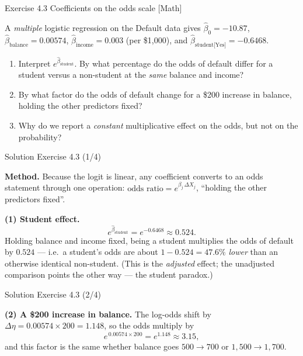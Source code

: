\documentclass[aspectratio=169,11pt]{beamer}
\begin{document}
\begin{frame}{Exercise 4.3 \textemdash{} Coefficients on the odds scale [Math]}
\begin{exercise}
A \emph{multiple} logistic regression on the Default data gives
$\hat\beta_0=-10.87$, $\hat\beta_{\text{balance}}=0.00574$,
$\hat\beta_{\text{income}}=0.003$ (per \$1{,}000), and
$\hat\beta_{\text{student[Yes]}}=-0.6468$.
\begin{enumerate}
  \item Interpret $e^{\hat\beta_{\text{student}}}$. By what percentage
        do the odds of default differ for a student versus a non-student
        at the \emph{same} balance and income?
  \item By what factor do the odds of default change for a \$200 increase
        in balance, holding the other predictors fixed?
  \item Why do we report a \emph{constant} multiplicative effect on the
        odds, but not on the probability?
\end{enumerate}
\end{exercise}
\end{frame}

\begin{frame}{Solution \textemdash{} Exercise 4.3 (1/4)}
\begin{solutionbox}
\textbf{Method.} Because the logit is linear, any coefficient converts
to an odds statement through one operation:
$\text{odds ratio} = e^{\beta_j\,\Delta X_j}$, ``holding the other
predictors fixed''.

\vspace{1mm}
\textbf{(1) Student effect.}
\[
  e^{\hat\beta_{\text{student}}} = e^{-0.6468} \approx 0.524 .
\]
Holding balance and income fixed, being a student multiplies the odds
of default by $0.524$ --- i.e.\ a student's odds are about
$1-0.524 = 47.6\%$ \emph{lower} than an otherwise identical
non-student. (This is the \emph{adjusted} effect; the unadjusted
comparison points the other way --- the student paradox.)

\vspace{1mm}
\end{solutionbox}
\end{frame}

\begin{frame}{Solution \textemdash{} Exercise 4.3 (2/4)}
\begin{solutionbox}
\textbf{(2) A \$200 increase in balance.} The log-odds shift by
$\Delta\eta = 0.00574 \times 200 = 1.148$, so the odds multiply by
\[
  e^{\,0.00574 \times 200} = e^{1.148} \approx 3.15 ,
\]
and this factor is the same whether balance goes
$500\to700$ or $1{,}500\to1{,}700$.
\end{solutionbox}
\end{frame}
\end{document}
